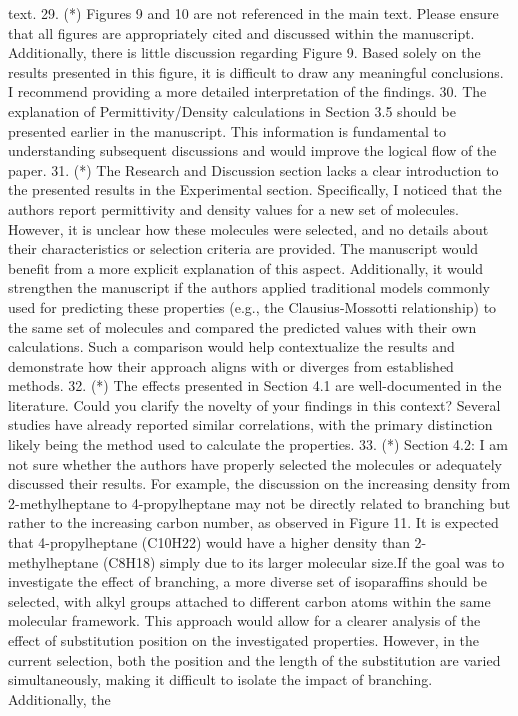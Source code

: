 \documentclass{article}
\begin{document}
text.
29.     (*) Figures 9 and 10 are not referenced in the main text. Please ensure that all figures are appropriately cited and discussed within the manuscript. Additionally, there is little discussion regarding Figure 9. Based solely on the results presented in this figure, it is difficult to draw any meaningful conclusions. I recommend providing a more detailed interpretation of the findings.
30.     The explanation of Permittivity/Density calculations in Section 3.5 should be presented earlier in the manuscript. This information is fundamental to understanding subsequent discussions and would improve the logical flow of the paper.
31.     (*) The Research and Discussion section lacks a clear introduction to the presented results in the Experimental section. Specifically, I noticed that the authors report permittivity and density values for a new set of molecules. However, it is unclear how these molecules were selected, and no details about their characteristics or selection criteria are provided. The manuscript would benefit from a more explicit explanation of this aspect. Additionally, it would strengthen the manuscript if the authors applied traditional models commonly used for predicting these properties (e.g., the Clausius-Mossotti relationship) to the same set of molecules and compared the predicted values with their own calculations. Such a comparison would help contextualize the results and demonstrate how their approach aligns with or diverges from established methods.
32.     (*) The effects presented in Section 4.1 are well-documented in the literature. Could you clarify the novelty of your findings in this context? Several studies have already reported similar correlations, with the primary distinction likely being the method used to calculate the properties.
33.     (*) Section 4.2: I am not sure whether the authors have properly selected the molecules or adequately discussed their results. For example, the discussion on the increasing density from 2-methylheptane to 4-propylheptane may not be directly related to branching but rather to the increasing carbon number, as observed in Figure 11. It is expected that 4-propylheptane (C10H22) would have a higher density than 2-methylheptane (C8H18) simply due to its larger molecular size.If the goal was to investigate the effect of branching, a more diverse set of isoparaffins should be selected, with alkyl groups attached to different carbon atoms within the same molecular framework. This approach would allow for a clearer analysis of the effect of substitution position on the investigated properties. However, in the current selection, both the position and the length of the substitution are varied simultaneously, making it difficult to isolate the impact of branching. Additionally, the
\end{document}
